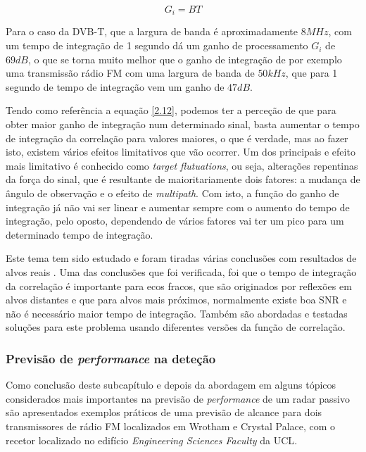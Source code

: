 \begin{equation} \label{2.12}
G_{i}=BT
\end{equation}

Para o caso da \gls{DVB-T}, que a largura de banda é aproximadamente $8 MHz$, com um tempo de integração de 1 segundo dá um ganho de processamento $G_{i}$ de $69dB$, o que se torna muito melhor que o ganho de integração de por exemplo uma transmissão rádio \gls{FM} com uma largura de banda de $50 kHz$, que para 1 segundo de tempo de integração vem um ganho de $47dB$.\par 
Tendo como referência a equação \ref{2.12}, podemos ter a perceção de que para obter maior ganho de integração num determinado sinal, basta aumentar o tempo de integração da correlação para valores maiores, o que é verdade, mas ao fazer isto, existem vários efeitos limitativos que vão ocorrer. Um dos principais e efeito mais limitativo é conhecido como \textit{target flutuations}, ou seja, alterações repentinas da força do sinal, que é resultante de maioritariamente dois fatores: a mudança de ângulo de observação e o efeito de \textit{multipath}. Com isto, a função do ganho de integração já não vai ser linear e aumentar sempre com o aumento do tempo de integração, pelo oposto, dependendo de vários fatores vai ter um pico para um determinado tempo de integração.\par 
Este tema tem sido estudado e foram tiradas várias conclusões com resultados de alvos reais \parencite{Malanowski2008}. Uma das conclusões que foi verificada, foi que o tempo de integração da correlação é importante para ecos fracos, que são originados por reflexões em alvos distantes e que para alvos mais próximos, normalmente existe boa \gls{SNR} e não é necessário maior tempo de integração. Também são abordadas e testadas soluções para este problema usando diferentes versões da função de correlação.

\subsubsection*{Previsão de \textit{performance} na deteção}
Como conclusão deste subcapítulo e depois da abordagem em alguns tópicos considerados mais importantes na previsão de \textit{performance} de um radar passivo são apresentados exemplos práticos \parencite{Griffiths2005} de uma previsão de alcance para dois transmissores de rádio \gls{FM} localizados em Wrotham e Crystal Palace, com o recetor localizado no edifício \textit{Engineering Sciences Faculty} da \gls{UCL}.

